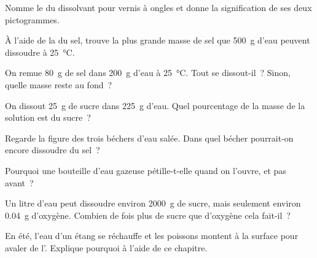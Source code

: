 \begin{exercise}[$\star$]\label{exo:g6:solutions-and-solubility:5}
Nomme le  du dissolvant pour vernis à ongles et donne la
signification de ses deux pictogrammes.
\end{exercise}

\begin{exercise}[$\star\star$]\label{exo:g6:solutions-and-solubility:6}
À l'aide de la  du sel, trouve la plus grande masse de sel que
\qty{500}{g} d'eau peuvent dissoudre à \qty{25}{\celsius}.
\end{exercise}

\begin{exercise}[$\star\star$]\label{exo:g6:solutions-and-solubility:7}
On remue \qty{80}{g} de sel dans \qty{200}{g} d'eau à
\qty{25}{\celsius}. Tout se dissout-il~? Sinon, quelle masse reste au
fond~?
\end{exercise}

\begin{exercise}[$\star\star$]\label{exo:g6:solutions-and-solubility:8}
On dissout \qty{25}{g} de sucre dans \qty{225}{g} d'eau. Quel
pourcentage de la masse de la solution est du sucre~?
\end{exercise}

\begin{exercise}[$\star\star$]\label{exo:g6:solutions-and-solubility:9}
Regarde la figure des trois béchers d'eau salée. Dans quel bécher
pourrait-on encore dissoudre du sel~?
\end{exercise}

\begin{exercise}[$\star\star$]\label{exo:g6:solutions-and-solubility:10}
Pourquoi une bouteille d'eau gazeuse pétille-t-elle quand on l'ouvre, et
pas avant~?
\end{exercise}

\begin{exercise}[$\star\star\star$]\label{exo:g6:solutions-and-solubility:11}
Un litre d'eau peut dissoudre environ \qty{2000}{g} de sucre, mais
seulement environ \qty{0.04}{g} d'oxygène. Combien de fois plus de sucre
que d'oxygène cela fait-il~?
\end{exercise}

\begin{exercise}[$\star\star\star$]\label{exo:g6:solutions-and-solubility:12}
En été, l'eau d'un étang se réchauffe et les poissons montent à la
surface pour avaler de l'. Explique pourquoi à l'aide de ce chapitre.
\end{exercise}

